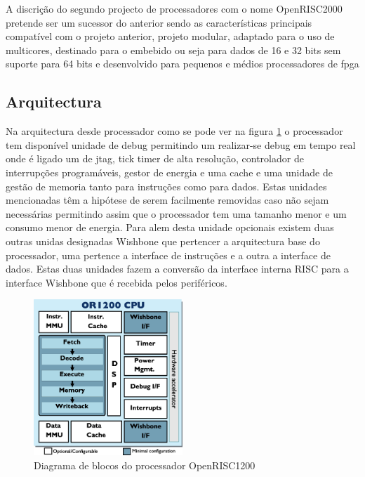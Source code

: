 A discrição do segundo projecto de processadores com o nome OpenRISC2000 pretende ser um sucessor do anterior sendo as características principais compatível com o projeto anterior, projeto modular, adaptado para o uso de multicores, destinado para o embebido ou seja para dados de 16 e 32 bits sem suporte para 64 bits e desenvolvido para pequenos e médios processadores de \acrlong{fpga}


\subsection{Arquitectura}

Na arquitectura desde processador como se pode ver na figura \ref{figures:or1200} o processador tem disponível unidade de debug permitindo um realizar-se debug em tempo real onde é ligado um de \acrlong{jtag}, \textcolor[rgb]{1,0,0}{tick timer} de alta resolução, controlador de interrupções programáveis, gestor de energia e uma cache e uma unidade de gestão de memoria tanto para instruções como para dados. Estas unidades mencionadas têm a hipótese de serem facilmente removidas caso não sejam necessárias permitindo assim que o processador tem uma tamanho menor e um consumo menor de energia. Para alem desta unidade opcionais existem duas outras unidas designadas Wishbone que pertencer a arquitectura base do processador, uma pertence a interface de instruções e a outra a interface de dados. Estas duas unidades fazem a conversão da interface interna RISC para a interface Wishbone que é recebida pelos periféricos.


\begin{figure}[!htb]
  \centering
  \includegraphics[width=0.5\textwidth]{Figures/Or1200_blocks.png} %
  \caption[Diagrama de blocos do processador OpenRISC1200]{Diagrama de blocos do processador OpenRISC1200}
  \label{figures:or1200}
\end{figure}  


